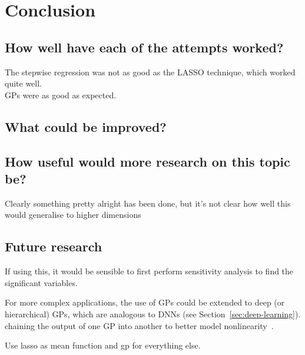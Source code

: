
\chapter{Conclusion}

\section{How well have each of the attempts worked?}

\begin{todo}
	The stepwise regression was not as good as the LASSO technique, which worked quite well. \\
	GPs were as good as expected.
\end{todo}

\section{What could be improved?}

\section{How useful would more research on this topic be?}

\begin{todo}
	Clearly something pretty alright has been done, but it's not clear how well this would generalise to higher dimensions
\end{todo}

\section{Future research}

If using this, it would be sensible to first perform sensitivity analysis to find the significant variables.

For more complex applications, the use of \acp{GP} could be extended to deep (or hierarchical) \acp{GP}, which are analogous to \acp{DNN} (see Section~\ref{sec:deep-learning}).
 chaining the output of one \ac{GP} into another to better model nonlinearity~\autocite{damianou2013}.

Use lasso as mean function and gp for everything else.
